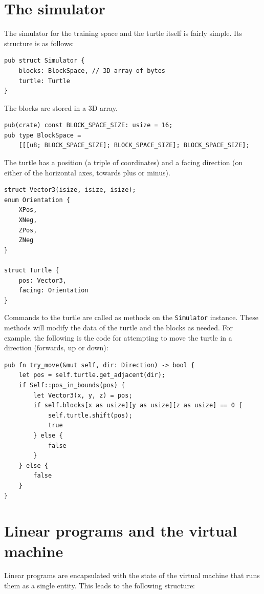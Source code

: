 \documentclass{report}
\begin{document}
\section{The simulator}
The simulator for the training space and the turtle itself is fairly simple. Its structure is as follows:

\begin{verbatim}
pub struct Simulator {
    blocks: BlockSpace, // 3D array of bytes
    turtle: Turtle
}
\end{verbatim}

The blocks are stored in a 3D array.

\begin{verbatim}
pub(crate) const BLOCK_SPACE_SIZE: usize = 16;
pub type BlockSpace = 
    [[[u8; BLOCK_SPACE_SIZE]; BLOCK_SPACE_SIZE]; BLOCK_SPACE_SIZE];
\end{verbatim}

The turtle has a position (a triple of coordinates) and a facing direction (on either of the horizontal axes, towards plus or minus).
\begin{verbatim}
struct Vector3(isize, isize, isize);
enum Orientation {
    XPos,
    XNeg,
    ZPos,
    ZNeg
}

struct Turtle {
    pos: Vector3,
    facing: Orientation
}
\end{verbatim}

Commands to the turtle are called as methods on the \verb|Simulator| instance. These methods will modify the data of the turtle and the blocks as needed. For example, the following is the code for attempting to move the turtle in a direction (forwards, up or down):

\begin{verbatim}
pub fn try_move(&mut self, dir: Direction) -> bool {
    let pos = self.turtle.get_adjacent(dir);
    if Self::pos_in_bounds(pos) {
        let Vector3(x, y, z) = pos;
        if self.blocks[x as usize][y as usize][z as usize] == 0 {
            self.turtle.shift(pos);
            true
        } else {
            false
        }
    } else {
        false
    }
}
\end{verbatim}

\section{Linear programs and the virtual machine}
Linear programs are encapsulated with the state of the virtual machine that runs them as a single entity. This leads to the following structure:
\end{document}
